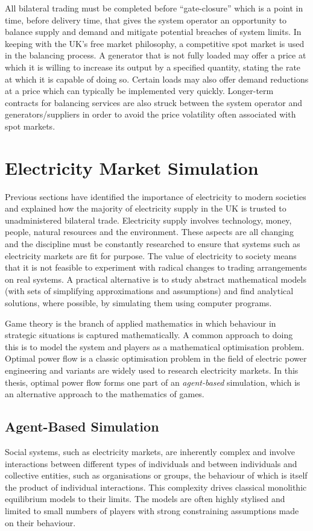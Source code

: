 All bilateral trading must be completed before ``gate-closure'' which is a
point in time, before delivery time, that gives the system operator an
opportunity to balance supply and demand and mitigate potential breaches of
system limits.  In keeping with the UK's free market philosophy, a competitive
spot market \cite{schweppe:spot} is used in the balancing process.  A
generator that is not fully loaded may offer a price at which it is willing to
increase its output by a specified quantity, stating the rate at which it is
capable of doing so.  Certain loads may also offer demand reductions at a
price which can typically be implemented very quickly.  Longer-term contracts
for balancing services are also struck between the system operator and
generators/suppliers in order to avoid the price volatility often associated
with spot markets.

\section{Electricity Market Simulation}
Previous sections have identified the importance of electricity to
modern societies and explained how the majority of electricity supply in the UK
is trusted to unadministered bilateral trade. Electricity supply involves
technology, money, people, natural resources and the environment.  These aspects are all changing and the discipline must be constantly researched to ensure that systems such as electricity markets are fit for purpose.  The value of electricity to society
means that it is not feasible to experiment with radical changes to trading
arrangements on real systems.  A practical alternative is to study abstract
mathematical models (with sets of simplifying approximations and assumptions)
and find analytical solutions, where possible, by simulating them using
computer programs.

Game theory is the branch of applied mathematics in which behaviour in
strategic situations is captured mathematically.  A common approach to doing
this is to model the system and players as a mathematical optimisation problem.  Optimal
power flow is a classic optimisation problem in the field of electric
power engineering and variants are widely used to research electricity
markets.  In this thesis, optimal power flow forms one part of an
\textit{agent-based} simulation, which is an alternative approach to the
mathematics of games.

\subsection{Agent-Based Simulation}
Social systems, such as electricity markets, are inherently complex and involve
interactions between different types of individuals and between individuals
and collective entities, such as organisations or groups, the behaviour of which
is itself the product of individual interactions.  This complexity
drives classical monolithic equilibrium models to their limits.  The models are
often highly stylised and limited to small numbers of players with strong
constraining assumptions made on their behaviour.

